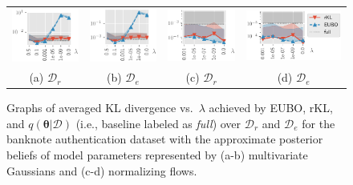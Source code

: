 \documentclass{article}
\theoremstyle{definition}
\newcommand{\mcl}[1]{\mathcal{#1}}
\newcommand{\da}{\mcl{D}}
\newcommand{\dc}{\mcl{D}_r}
\newcommand{\dr}{\mcl{D}_e}
\begin{document}
\begin{figure}
\centering
\begin{tabular}{@{}c@{}c@{}c@{}c@{}}
\includegraphics[height=0.18\textwidth]{img/likelihood_diff/banknote_authentication1_gauss_fullcov_likelihood_remain_retrain_f.pdf}
&
\includegraphics[height=0.17\textwidth]{img/likelihood_diff/banknote_authentication1_gauss_fullcov_likelihood_remove_retrain_f.pdf}
&
\includegraphics[height=0.17\textwidth]{img/likelihood_diff/banknote_authentication1_maf_likelihood_remain_retrain_f.pdf}
&
\includegraphics[height=0.17\textwidth]{img/likelihood_diff/banknote_authentication1_maf_likelihood_remove_retrain_f_legend.pdf}
\\
(a) $\dc$
&
(b) $\dr$
&
(c) $\dc$
&
(d) $\dr$
\end{tabular}\vspace{-2mm}
\caption{Graphs of averaged KL divergence vs.~$\lambda$ achieved by EUBO, rKL, and $q(\bm{\theta}|\da)$ (i.e., baseline labeled as \emph{full}) over $\dc$ and $\dr$ 
for the banknote authentication dataset with the approximate posterior beliefs of model parameters represented by (a-b) multivariate Gaussians and (c-d) normalizing flows.}
\label{fig:authenresult}\vspace{-2.8mm}
\end{figure}
%
\end{document}
